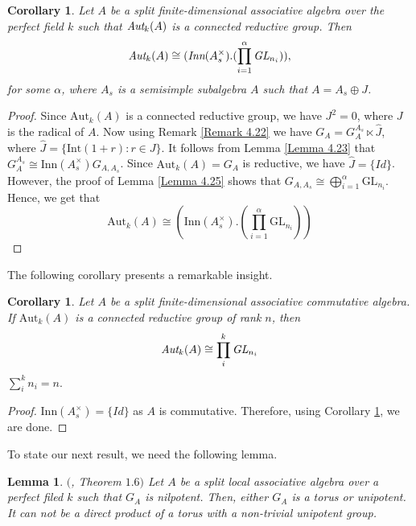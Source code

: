 \documentclass[12pt]{amsart}
\newtheorem{lemma}[theorem]{Lemma}
\newtheorem{corollary}[theorem]{Corollary}
\theoremstyle{definition}
\numberwithin{equation}{section}
\begin{document}
\begin{corollary}\label{Corollary 4.30}
Let $A$ be a split finite-dimensional associative algebra over the perfect field $k$ such that $\emph{\text{Aut}}_k(A)$ is a connected reductive group. Then \[\emph{\text{Aut}}_k(A)\cong (\emph{Inn}(A_s^{\times}).(\prod_{i=1}^{\alpha} \emph{GL}_{n_{i}})),\] for some $\alpha$, where $A_s$ is a semisimple subalgebra $A$ such that $A= A_s\oplus J$.
\end{corollary}
\vskip1mm
\begin{proof}
 Since $\text{Aut}_k(A)$ is a connected reductive group, we have $J^2=0$, where $J$ is the radical of $A$. Now using Remark \ref{Remark 4.22} we have $G_A=G_{A}^{A_s}\ltimes \hat{J}$, where $\hat{J}=\{\text{Int}(1+r):r\in J\}$. It follows from Lemma \ref{Lemma 4.23} that $G_{A}^{A_s}\cong\text{Inn}(A_s^{\times})G_{A,A_s}$. Since $\text{Aut}_{k}(A)=G_A$ is reductive, we have $\hat{J}=\{Id\}$. However, the proof of Lemma \ref{Lemma 4.25} shows that $G_{A,A_s}\cong \bigoplus_{i=1}^{\alpha} \text{GL}_{n_i}$. Hence, we get that
\begin{equation*}\label{eq17}
\text{Aut}_k(A)\cong (\text{Inn}(A_s^{\times}).(\prod_{i=1}^{\alpha} \text{GL}_{n_{i}}))
\end{equation*}
\end{proof}

\vskip2mm 
\noindent
The following corollary presents a remarkable insight.

\vskip2mm

\begin{corollary}\label{Corollary 4.31}
Let $A$ be a split finite-dimensional associative commutative algebra. If $\mathrm{Aut}_k(A)$ is a connected reductive group of rank $n$, then
\begin{equation*}\label{eq18}
\emph{\text{Aut}}_k(A)\cong \prod_{i}^{k} \emph{GL}_{n_{i}}
\end{equation*}
 $\sum_{i}^{k} n_i=n.$
\end{corollary}
\vskip1mm
\begin{proof}
$\text {Inn}(A_s^{\times})=\{Id\}$ as $A$ is commutative. Therefore, using Corollary \ref{Corollary 4.30}, we are done.
\end{proof}

\vskip2mm
\noindent
To state our next result, we need the following lemma.

\vskip2mm

\begin{lemma}\label{Lemma 4.32}
$($\cite{Pollack}, \emph{Theorem} $1.6)$ Let $A$ be a split local associative algebra over a perfect filed $k$ such that $G_A$ is nilpotent. Then, either $G_A$ is a torus or unipotent. It can not be a direct product of a torus with a non-trivial unipotent group.   
\end{lemma}
\end{document}
